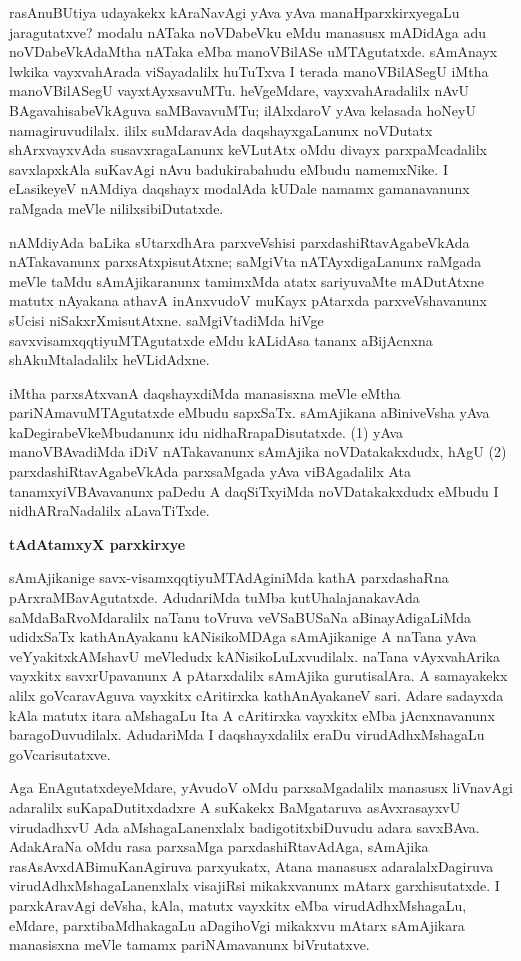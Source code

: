 rasAnuBUtiya udayakekx kAraNavAgi yAva yAva manaHparxkirxyegaLu jaragu\-tatxve? modalu nATaka noVDabeVku eMdu manasusx mADidAga adu noVDabeVkA\-daMtha nATaka eMba manoVBilASe uMTAgutatxde. sAmAnayx lwkika vayxvahArada viSayadalilx huTuTxva I terada manoVBilASegU iMtha manoVBilASegU vayxtAyxsa\-vuMTu. heVgeMdare, vayxvahAradalilx nAvU BAgavahisabeVkAguva saMBavavuMTu; ilAlxdaroV yAva kelasada hoNeyU namagiruvudilalx. ililx suMdaravAda daqshayxgaLanunx noVDutatx shArxvayxvAda susavxragaLanunx keVLutAtx oMdu divayx parxpaMcadalilx savxlapxkAla suKavAgi nAvu badukirabahudu eMbudu namemxNike. I eLasikeyeV nAMdiya daqshayx modalAda kUDale namamx gamanavanunx raMgada meVle nililxsibiDutatxde.

nAMdiyAda baLika sUtarxdhAra parxveVshisi parxdashiRtavAgabeVkAda nATakavanunx parxsAtxpisutAtxne; saMgiVta nATAyxdigaLanunx raMgada meVle taMdu sAmAjikaranunx tamimxMda atatx sariyuvaMte mADutAtxne matutx nAyakana athavA inAnxvudoV muKayx pAtarxda parxveVshavanunx sUcisi niSakxrXmisutAtxne. saMgiVtadiMda hiVge savxvisamxqqtiyuMTAgutatxde eMdu kALidAsa tananx aBijAcnxna shAkuMtaladalilx heVLidAdxne.

iMtha parxsAtxvanA daqshayxdiMda manasisxna meVle eMtha pariNAmavuMTAgutatxde eMbudu sapxSaTx. sAmAjikana aBiniveVsha yAva kaDegirabeVkeMbudanunx idu nidhaRrapaDisutatxde. (1) yAva manoVBAvadiMda iDiV nATakavanunx sAmAjika noVDatakakxdudx, hAgU (2) parxdashiRtavAgabeVkAda parxsaMgada yAva viBAgadalilx Ata tanamxyiVBAvavanunx paDedu A daqSiTxyiMda noVDatakakxdudx eMbudu I nidhARraNadalilx aLavaTiTxde.

\bigskip
\begin{center}
{\Large\bf tAdAtamxyX parxkirxye}
\end{center}

sAmAjikanige savx-visamxqqtiyuMTAdAginiMda kathA parxdashaRna pArxraMBavAgutatxde. AdudariMda tuMba kutUhalajanakavAda saMdaBaRvoMdaralilx naTanu toVruva veVSa\-BUSaNa aBinayAdigaLiMda udidxSaTx kathAnAyakanu kANisikoMDAga sAmAjikanige A naTana yAva veYyakitxkAMshavU meVledudx kANisikoLuLxvudilalx. naTana vAyxvahArika vayxkitx savxrUpavanunx A pAtarxdalilx sAmAjika gurutisalAra. A samayakekx alilx goVcaravAguva vayxkitx cAritirxka kathAnAyakaneV sari. Adare sadayxda kAla matutx itara aMshagaLu Ita A cAritirxka vayxkitx eMba jAcnxnavanunx baragoDuvudilalx. AdudariMda I daqshayxdalilx eraDu virudAdhxMshagaLu goVcarisutatxve.

Aga EnAgutatxdeyeMdare, yAvudoV oMdu parxsaMgadalilx manasusx liVnavAgi adaralilx suKapaDutitxdadxre A suKakekx BaMgataruva asAvxrasayxvU virudadhxvU Ada aMshagaLanenxlalx badigotitxbiDuvudu adara savxBAva. AdakAraNa oMdu rasa parxsaMga parxdashiRtavAdAga, sAmAjika rasAsAvxdABimuKanAgiruva parxyukatx, Atana manasusx adaralalxDagiruva virudAdhxMshagaLanenxlalx visajiRsi mikakxvanunx mAtarx garxhisutatxde. I parxkAravAgi deVsha, kAla, matutx vayxkitx eMba virudAdhxMshagaLu, eMdare, parxtibaMdhakagaLu aDagihoVgi mikakxvu mAtarx sAmAjikara manasisxna meVle tamamx pariNAmavanunx biVrutatxve.

